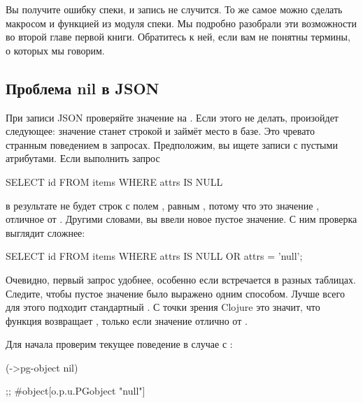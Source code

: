 Вы получите ошибку спеки, и запись не случится. То же самое можно сделать макросом  и функцией  из модуля спеки. Мы подробно разобрали эти возможности во второй главе первой книги. Обратитесь к ней, если вам не понятны термины, о которых мы говорим.

\subsection{Проблема nil в JSON}


При записи JSON проверяйте значение на . Если этого не делать, произойдет следующее: значение  станет строкой  и займёт место в базе. Это чревато странным поведением в запросах. Предположим, вы ищете записи с пустыми атрибутами. Если выполнить запрос

\begin{english}
  \begin{sql}
SELECT id FROM items WHERE attrs IS NULL
  \end{sql}
\end{english}

\noindent
в результате не будет строк с полем , равным , потому что это значение , отличное от . Другими словами, вы ввели новое пустое значение. С ним проверка выглядит сложнее:

\begin{english}
  \begin{sql}
SELECT id FROM items
WHERE attrs IS NULL OR attrs = 'null';
  \end{sql}
\end{english}

Очевидно, первый запрос удобнее, особенно если  встречается в разных таблицах. Следите, чтобы пустое значение было выражено одним способом. Лучше всего для этого подходит стандартный . С точки зрения Clojure это значит, что функция  возвращает , только если значение отлично от .

Для начала проверим текущее поведение в случае с :

\begin{english}
  \begin{clojure}
(->pg-object nil)

;; #object[o.p.u.PGobject "null"]
  \end{clojure}
\end{english}


